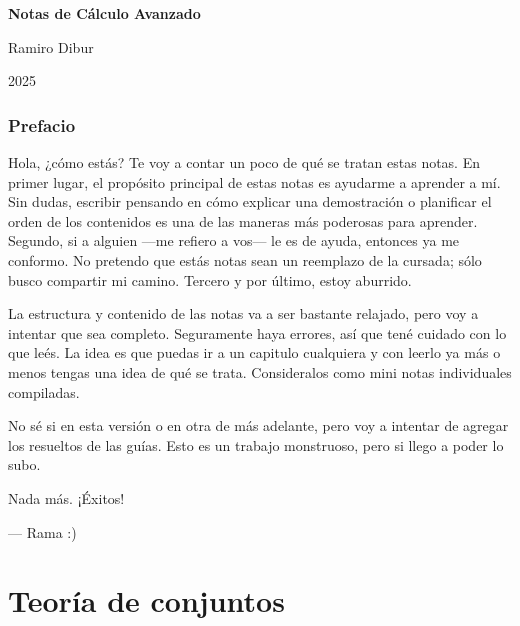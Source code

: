 \documentclass[11pt, a4paper, oneside]{book}
\theoremstyle{plain}
\theoremstyle{definition}
\theoremstyle{remark}
\begin{document}
\thispagestyle{empty}
\vspace*{\fill}
\begin{center}
	{\fontsize{50pt}{52pt}\selectfont\color{accentcolor}\bfseries{Notas de Cálculo Avanzado}\MakeUppercase{}\par}
	\vspace{2.5cm}
	{\Huge\sffamily Ramiro Dibur \par}
	\vspace{0.8cm}
	\vspace{1.5cm}
	{\Large 2025 \par}
\end{center}
\vspace*{\fill}

\newpage

\frontmatter

\section*{Prefacio}

Hola, ¿cómo estás? Te voy a contar un poco de qué se tratan estas notas. En primer lugar, el propósito principal de estas notas es ayudarme a aprender a mí. Sin dudas, escribir pensando en cómo explicar una demostración o planificar el orden de los contenidos es una de las maneras más poderosas para aprender. Segundo, si a alguien ---me refiero a vos--- le es de ayuda, entonces ya me conformo. No pretendo que estás notas sean un reemplazo de la cursada; sólo busco compartir mi camino. Tercero y por último, estoy aburrido.

La estructura y contenido de las notas va a ser bastante relajado, pero voy a intentar que sea completo. Seguramente haya errores, así que tené cuidado con lo que leés. La idea es que puedas ir a un capitulo cualquiera y con leerlo ya más o menos tengas una idea de qué se trata. Consideralos como mini notas individuales compiladas.

No sé si en esta versión o en otra de más adelante, pero voy a intentar de agregar los resueltos de las guías. Esto es un trabajo monstruoso, pero si llego a poder lo subo.

Nada más. ¡Éxitos!

\hfill --- Rama :)

\tableofcontents

\mainmatter

\part{Teoría de conjuntos}
\end{document}
